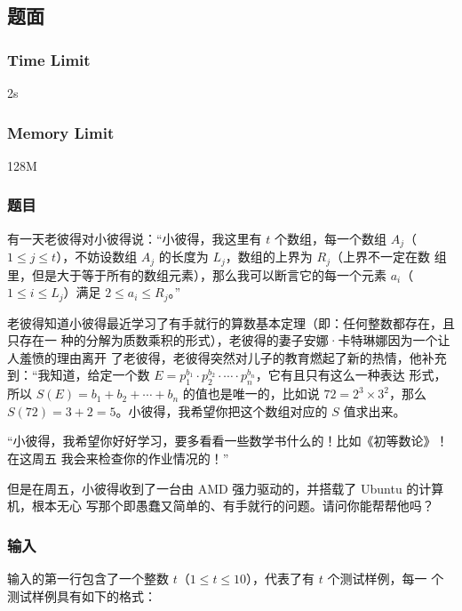 \subsection{题面}

\subsubsection{Time Limit}
2s

\subsubsection{Memory Limit}
128M

\subsubsection{题目}
有一天老彼得对小彼得说：“小彼得，我这里有 $t$ 个数组，每一个数组  $A_j$（$1 \le
j \le t$），不妨设数组 $A_j$ 的长度为 $L_j$，数组的上界为 $R_j$（上界不一定在数
组里，但是大于等于所有的数组元素），那么我可以断言它的每一个元素 $a_i$（$1 \le i
\le L_j$）满足 $2 \le a_i \le R_j$。”

老彼得知道小彼得最近学习了有手就行的算数基本定理（即：任何整数都存在，且只存在一
种的分解为质数乘积的形式），老彼得的妻子安娜·卡特琳娜因为一个让人羞愤的理由离开
了老彼得，老彼得突然对儿子的教育燃起了新的热情，他补充到：“我知道，给定一个数 $E
= p_1^{b_1}\cdot p_2^{b_2}\cdot \cdots \cdot p_n^{b_n}$，它有且只有这么一种表达
形式，所以 $S(E) = b_1 + b_2 + \cdots + b_n$ 的值也是唯一的，比如说 $72 = 2^3
\times 3^2$，那么 $S(72)=3+2=5$。小彼得，我希望你把这个数组对应的 $S$ 值求出来。

“小彼得，我希望你好好学习，要多看看一些数学书什么的！比如《初等数论》！在这周五
我会来检查你的作业情况的！”

但是在周五，小彼得收到了一台由 AMD 强力驱动的，并搭载了 Ubuntu 的计算机，根本无心
写那个即愚蠢又简单的、有手就行的问题。请问你能帮帮他吗？

\subsubsection{输入}
输入的第一行包含了一个整数 $t$（$1\le t \le 10$），代表了有 $t$ 个测试样例，每一
个测试样例具有如下的格式：

